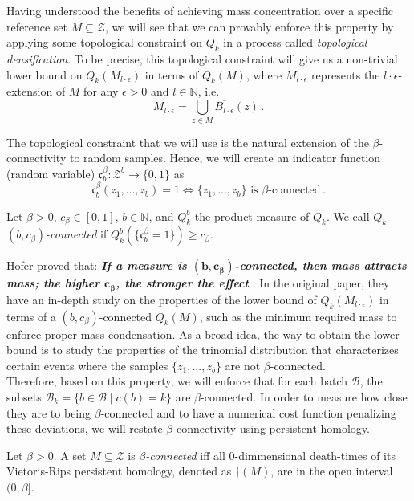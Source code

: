 \documentclass[../main.tex]{subfiles}
\begin{document}
Having understood the benefits of achieving mass concentration over a specific reference set  $M \subseteq \mathcal{Z}$, we will see that we can provably enforce this property by applying some topological constraint on $Q_k$ in a process called \emph{topological densification}. To be precise, this topological constraint will give us a non-trivial lower bound on $Q_k(M_{l\cdot \epsilon})$ in terms of $Q_k(M)$, where $M_{l\cdot \epsilon}$ represents the $l\cdot \epsilon$-extension of $M$ for any $\epsilon>0$ and $l\in \mathbb{N}$, i.e.
\[
M_{l\cdot \epsilon} = \bigcup_{z\in M} \overline{B_{l\cdot \epsilon}}(z)\,.
\]


The topological constraint that we will use is the natural extension of the $\beta$-connectivity to random samples. Hence, we will create an indicator function (random variable) $\mathfrak{c}_b^\beta: \mathcal{Z}^b \to \{0,1\}$ as 
\[
\mathfrak{c}_b^\beta(z_1, ..., z_b) = 1 \Leftrightarrow \{z_1, ..., z_b\} \text{ is } \beta\text{-connected}\,.
\]
\begin{definition}
Let $\beta>0$, $c_\beta\in [0,1]$, $b\in \mathbb{N}$, and $Q_k^b$ the product measure of $Q_k$. We call $Q_k$ \emph{$(b, c_\beta)$-connected} if $Q_k^b(\{\mathfrak{c}_b^\beta = 1\})\geq c_\beta$.
\end{definition}

Hofer \etal proved that: \emph{\textbf{If a measure is $\bm{(b, c_\beta)}$-connected, then mass attracts mass; the higher $\bm{c_\beta}$, the stronger the effect}} \cite{hofer_densified_2021}. In the original paper, they have an in-depth study on the properties of the lower bound of $Q_k(M_{l\cdot \epsilon})$ in terms of a $(b, c_\beta)$-connected $Q_k(M)$, such as the minimum required mass to enforce proper mass condensation. As a broad idea, the way to obtain the lower bound is to study the properties of the trinomial distribution that characterizes certain events where the samples $\{z_1, ..., z_b\}$ are not $\beta$-connected.\\

Therefore, based on this property, we will enforce that for each batch $\mathcal{B}$, the subsets $\mathcal{B}_k=\{b \in \mathcal{B} \mid c(b)=k\}$ are $\beta$-connected. In order to measure how close they are to being $\beta$-connected and to have a numerical cost function penalizing these deviations, we will restate $\beta$-connectivity using persistent homology.

\begin{definition}
Let $\beta>0$. A set $M\subseteq \mathcal{Z}$ is \emph{$\beta$-connected} iff all $0$-dimmensional death-times of its Vietoris-Rips persistent homology, denoted as $\dag(M)$, are in the open interval $(0, \beta]$. 
\end{definition}
\end{document}
